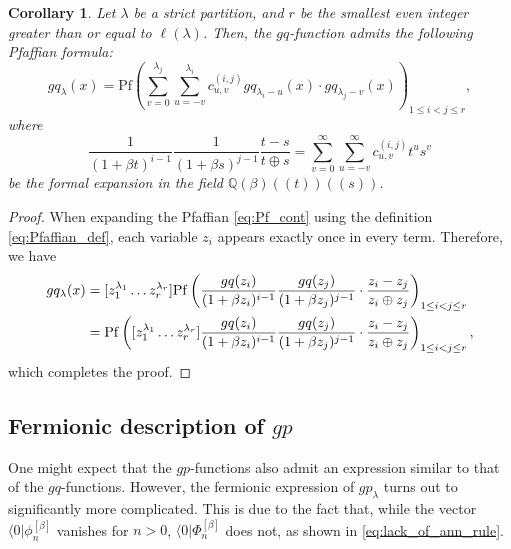 \documentclass{amsart}
\newtheorem{cor}[thm]{Corollary}
\def\QQ{\mathord{\mathbb{Q}}}
\def\bra#1{\langle #1 \vert}
\begin{document}
\begin{cor}
Let $\lambda$ be a strict partition, and $r$ be the smallest even integer greater than or equal to $\ell(\lambda)$.
Then, the $gq$-function admits the following Pfaffian formula:
\[
gq_\lambda(x)=\mathrm{Pf}\left(
\sum_{v=0}^{\lambda_j}
\sum_{u=-v}^{\lambda_i} c^{(i,j)}_{u,v}gq_{\lambda_i-u}(x)\cdot gq_{\lambda_j-v}(x)
\right)_{1\leq i<j\leq r},
\]
where
\[
\frac{1}{(1+\beta t)^{i-1}}\frac{1}{(1+\beta s)^{j-1}}\frac{t- s}{t\oplus s}
=
\sum_{v=0}^\infty 
\sum_{u=-v}^\infty 
c^{(i,j)}_{u,v}t^us^v
\]
be the formal expansion in the field $\QQ(\beta)((t))((s))$.
\end{cor}
\begin{proof}
When expanding the Pfaffian \eqref{eq:Pf_cont} using the definition \eqref{eq:Pfaffian_def}, each variable $z_i$ appears exactly once in every term.
Therefore, we have 
\begin{align*}
gq_\lambda(x)&=[z_1^{\lambda_1}\dots z_r^{\lambda_r}]
\mathrm{Pf}\left(
\frac{gq(z_i)}{(1+\beta z_i)^{i-1}}
\frac{gq(z_j)}{(1+\beta z_j)^{j-1}}
\cdot 
\frac{z_i-z_j}{z_i\oplus z_j}
\right)_{1\leq i<j\leq r}\allowdisplaybreaks\\
&=
\mathrm{Pf}\left([z_1^{\lambda_1}\dots z_r^{\lambda_r}]
\frac{gq(z_i)}{(1+\beta z_i)^{i-1}}
\frac{gq(z_j)}{(1+\beta z_j)^{j-1}}
\cdot 
\frac{z_i-z_j}{z_i\oplus z_j}
\right)_{1\leq i<j\leq r},
\end{align*}
which completes the proof.
\end{proof}


\subsection{Fermionic description of $gp$}
\label{sec:fermionic_pre_of_gp}

One might expect that the $gp$-functions also admit an expression similar to that of the $gq$-functions.
However, the fermionic expression of $gp_\lambda$ turns out to significantly more complicated.
This is due to the fact that, while the vector $\bra{0}\phi_n^{[\beta]}$ vanishes for $n>0$, $\bra{0}\Phi_n^{[\beta]}$ does not, as shown in \eqref{eq:lack_of_ann_rule}.
\end{document}
